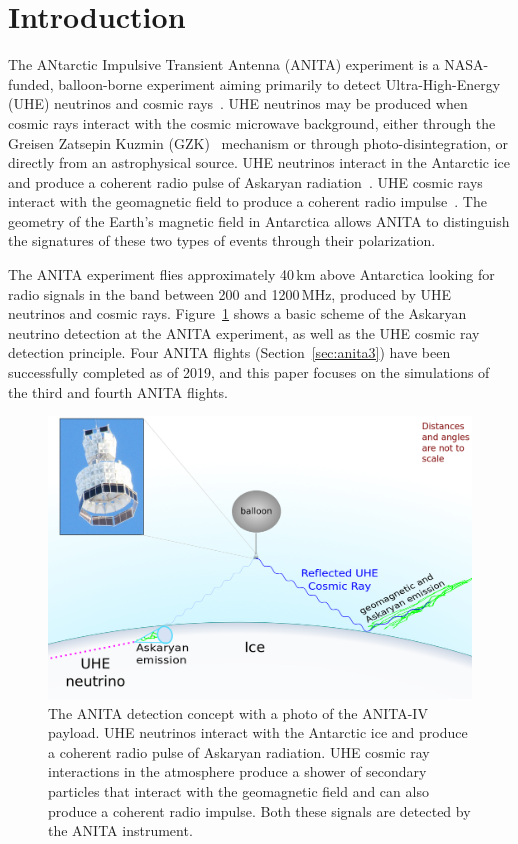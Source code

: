 \section{Introduction}
The ANtarctic Impulsive Transient Antenna (ANITA) experiment is a NASA-funded, balloon-borne experiment aiming primarily to detect Ultra-High-Energy (UHE) neutrinos and cosmic rays~\cite{ANITA1detector,ANITA1paper,ANITA2paper,ANITA2erratum}.
UHE neutrinos may be produced when cosmic rays interact with the
cosmic microwave background, either through the Greisen Zatsepin
Kuzmin (GZK)~\cite{greisen1966end,zatsepin1966gt} mechanism or through photo-disintegration, or directly from an astrophysical source.
UHE neutrinos interact in the Antarctic ice and produce a coherent radio pulse of Askaryan radiation~\cite{askaryan}. UHE cosmic rays interact with the geomagnetic field to produce a coherent radio impulse~\cite{suprun2003synchrotron,falcke2003detecting,ANITA1UHECR}. The geometry of the Earth's magnetic field in Antarctica allows ANITA to distinguish the signatures of these two types of events through their polarization.

The ANITA experiment flies approximately 40\,km above Antarctica looking for radio signals in the band between 200 and 1200\,MHz, produced by UHE neutrinos and cosmic rays.
Figure~\ref{fig:intro_ANITAconcept} shows a basic scheme of the
Askaryan neutrino detection at the ANITA experiment, as well as the UHE cosmic ray detection principle.
Four ANITA flights (Section~\ref{sec:anita3}) have been successfully
completed as of 2019, and this paper focuses on the simulations of the third and fourth ANITA flights.

\begin{figure}[!h]\centering
  \includegraphics[width=.8\linewidth]{./Figs/ANITA_scheme_icemcpaper.png}
  \caption{The ANITA detection concept with a photo of the ANITA-IV
    payload. UHE neutrinos interact with the Antarctic ice and produce
    a coherent radio pulse of Askaryan radiation. UHE cosmic ray
    interactions in the atmosphere produce a shower of secondary
    particles that interact with the geomagnetic field and can also
    produce a coherent radio impulse. Both these signals are detected by the ANITA instrument. 
  }
  \label{fig:intro_ANITAconcept}
\end{figure}



